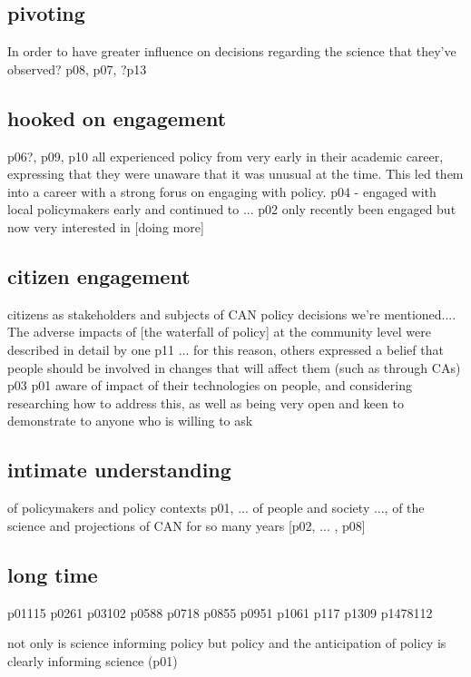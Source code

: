 \subsection{pivoting}
In order to have greater influence on decisions regarding the science that they've observed?
p08, p07, ?p13

\subsection{hooked on engagement}
p06?, p09, p10 all experienced policy from very early in their academic career, expressing that they were unaware that it was unusual at the time. This led them into a career with a strong forus on engaging with policy. p04 - engaged with local policymakers early and continued to ... p02 only recently been engaged but now very interested in [doing more]

\subsection{citizen engagement}
citizens as stakeholders and subjects of CAN policy decisions we're mentioned.... The adverse impacts of [the waterfall of policy] at the community level were described in detail by one p11 ... for this reason, others expressed a belief that people should be involved in changes that will affect them (such as through CAs) p03  p01 aware of impact of their technologies on people, and considering researching how to address this, as well as being very open and keen to demonstrate to anyone who is willing to ask

\subsection{intimate understanding}
of policymakers and policy contexts p01, ...
of people and society ..., of the science and projections of CAN for so many years [p02, ... , p08]
\subsection{long time} {p01}{115} {p02}{61} {p03}{102} {p05}{88} {p07}{18} {p08}{55} {p09}{51} {p10}{61} {p11}{7} {p13}{09} {p14}{78}{112}

not only is science informing policy but policy and the anticipation of policy is clearly informing science (p01) 


